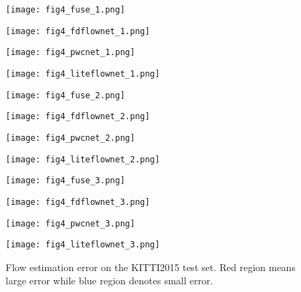 \documentclass{article}
\begin{document}
\begin{figure*}[ht]
	\setlength{\abovecaptionskip}{2pt}
	\centering
	\begin{minipage}[b]{0.24\textwidth}
		\texttt{[image: fig4\_fuse\_1.png]}
	\end{minipage}
	\begin{minipage}[b]{0.24\textwidth}
		\texttt{[image: fig4\_fdflownet\_1.png]}
	\end{minipage}
	\begin{minipage}[b]{0.24\textwidth}
		\texttt{[image: fig4\_pwcnet\_1.png]}
	\end{minipage}
	\begin{minipage}[b]{0.24\textwidth}
		\texttt{[image: fig4\_liteflownet\_1.png]}
	\end{minipage}

	\begin{minipage}[b]{0.24\textwidth}
		\texttt{[image: fig4\_fuse\_2.png]}
	\end{minipage}
	\begin{minipage}[b]{0.24\textwidth}
		\texttt{[image: fig4\_fdflownet\_2.png]}
	\end{minipage}
	\begin{minipage}[b]{0.24\textwidth}
		\texttt{[image: fig4\_pwcnet\_2.png]}
	\end{minipage}
	\begin{minipage}[b]{0.24\textwidth}
		\texttt{[image: fig4\_liteflownet\_2.png]}
	\end{minipage}

	\begin{minipage}[b]{0.24\textwidth}
		\texttt{[image: fig4\_fuse\_3.png]}
	\end{minipage}
	\begin{minipage}[b]{0.24\textwidth}
		\texttt{[image: fig4\_fdflownet\_3.png]}
	\end{minipage}
	\begin{minipage}[b]{0.24\textwidth}
		\texttt{[image: fig4\_pwcnet\_3.png]}
	\end{minipage}
	\begin{minipage}[b]{0.24\textwidth}
		\texttt{[image: fig4\_liteflownet\_3.png]}
	\end{minipage}
	\caption{Flow estimation error on the KITTI2015 test set. Red region means large error while blue region denotes small error.}
	\label{fig:4}
\end{figure*}
\end{document}
